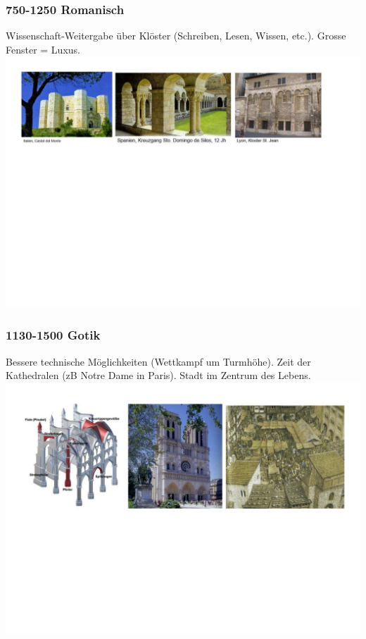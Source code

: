 \documentclass[10pt, openright=true]{scrartcl}
\begin{document}
\subsubsection{750-1250 Romanisch}
Wissenschaft-Weitergabe über Klöster (Schreiben, Lesen, Wissen, etc.). Grosse Fenster = Luxus. \\
\includegraphics[width=1\textwidth]{images/romanisch}
\subsubsection{1130-1500 Gotik}
Bessere technische Möglichkeiten (Wettkampf um Turmhöhe). Zeit der Kathedralen (zB Notre Dame in Paris). Stadt im Zentrum des Lebens.\\
\includegraphics[width=1\textwidth]{images/gotik}
\end{document}
